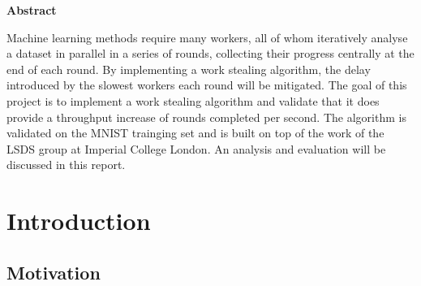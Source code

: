\documentclass[12pt]{article}
\begin{document}
\vspace*{\fill}
\centerline{\large{\textbf{Abstract}}}
Machine learning methods require many workers, all of whom iteratively analyse a dataset in parallel in a series of rounds, collecting their progress centrally at the end of each round. By implementing a work stealing algorithm, the delay introduced by the slowest workers each round will be mitigated. The goal of this project is to implement a work stealing algorithm and validate that it does provide a throughput increase of rounds completed per second. The algorithm is validated on the MNIST trainging set and is built on top of the work of the LSDS group at Imperial College London. An analysis and evaluation will be discussed in this report.
\vspace*{\fill}

\newpage

\tableofcontents

\newpage

\section{Introduction}

\subsection{Motivation}
\end{document}
